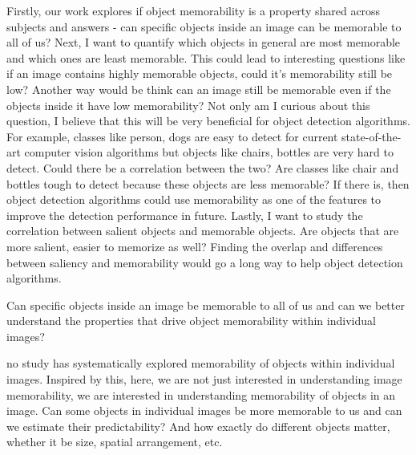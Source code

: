 Firstly, our work explores if object memorability is a property shared across subjects and answers - can specific objects inside an image can be memorable to all of us? Next, I want to quantify which objects in general are most memorable and which ones are least memorable. This could lead to interesting questions like if an image contains highly memorable objects, could it's memorability still be low? Another way would be think can an image still be memorable even if the objects inside it have low memorability? Not only am I curious about this question, I believe that this will be very beneficial for object detection algorithms. For example, classes like person, dogs are easy to detect for current state-of-the-art computer vision algorithms but objects like chairs, bottles are very hard to detect. Could there be a correlation between the two? Are classes like chair and bottles tough to detect because these objects are less memorable? If there is, then object detection algorithms could use memorability as one of the features to improve the detection performance in future. Lastly, I want to study the correlation between salient objects and memorable objects. Are objects that are more salient, easier to memorize as well? Finding the overlap and differences between saliency and memorability would go a long way to help object detection algorithms.

Can specific objects inside an image be memorable to all of us and can we better understand the properties that drive object memorability within individual images?



 
 no study has systematically explored memorability of objects within individual images. Inspired by this, here, we are not just interested in understanding image memorability, we are interested in understanding memorability of objects in an image. Can some objects in individual images be more memorable to us and can we estimate their predictability?  And how exactly do different objects matter, whether it be size, spatial arrangement, etc.

%
%

